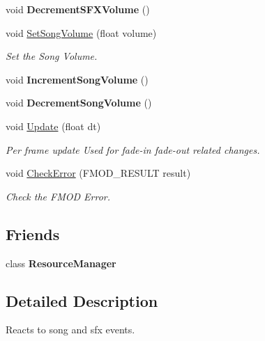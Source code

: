 \begin{DoxyCompactItemize}
\mbox{\label{classAudioManager_aa486a36bcc936a5529c97dea6e78a536}} 
void {\bfseries Decrement\+S\+F\+X\+Volume} ()
\item 
void \hyperlink{classAudioManager_acc31d4056bfdcfff325a91bcd583b8a0}{Set\+Song\+Volume} (float volume)
\begin{DoxyCompactList}\small\item\em Set the Song Volume. \end{DoxyCompactList}\item 
\mbox{\label{classAudioManager_a8d47c27a446ed51eb8a3a3f51fc4d2fb}} 
void {\bfseries Increment\+Song\+Volume} ()
\item 
\mbox{\label{classAudioManager_ab500238a1a478a9325fdcaf1538d26cb}} 
void {\bfseries Decrement\+Song\+Volume} ()
\item 
void \hyperlink{classAudioManager_a0c203bcb774ef51b949a7e20f598630a}{Update} (float dt)
\begin{DoxyCompactList}\small\item\em Per frame update Used for fade-\/in fade-\/out related changes. \end{DoxyCompactList}\item 
void \hyperlink{classAudioManager_a37c83447f25569c6dc6b1d022230ad70}{Check\+Error} (F\+M\+O\+D\+\_\+\+R\+E\+S\+U\+LT result)
\begin{DoxyCompactList}\small\item\em Check the F\+M\+OD Error. \end{DoxyCompactList}\end{DoxyCompactItemize}
\subsection*{Friends}
\begin{DoxyCompactItemize}
\item 
\mbox{\label{classAudioManager_a54c1252abc87a78a301e6b6984470408}} 
class {\bfseries Resource\+Manager}
\end{DoxyCompactItemize}


\subsection{Detailed Description}
Reacts to song and sfx events. 

